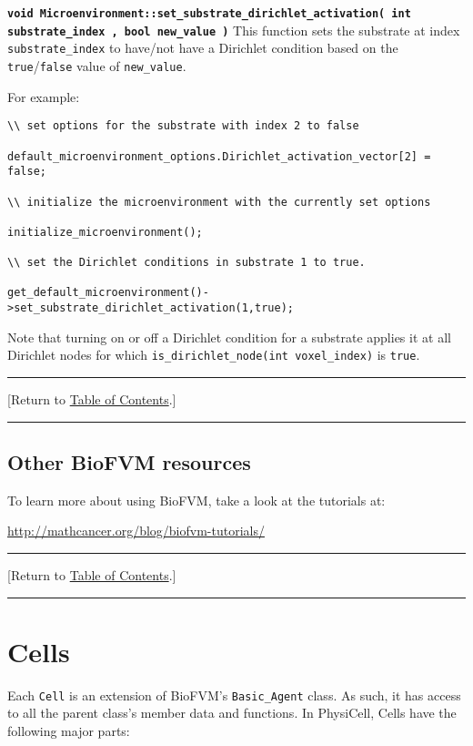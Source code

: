 \documentclass[12pt]{article}
\renewcommand{\v}{\verb}
\newcommand{\smallcode}[1]{\textbf{\texttt{#1}}}
\newcommand{\blue}[1]{\textcolor{blue}{#1}}
\newcommand{\DONE}{}%
\newcommand{\TOClink}{\begin{center}\hrule\vskip-10pt\phantom{.}\hfill[Return to \hyperlink{TOC}{Table of Contents}.]\hfill\phantom{.}\vskip3pt\hrule\end{center}}
\begin{document}
\smallcode{void Microenvironment::set\_substrate\_dirichlet\_activation( int substrate\_index , bool new\_value )} 
This function sets the substrate at index \v|substrate_index| to have/not have a Dirichlet condition 
based on the \v|true|/\v|false| value of \v|new_value|.


For example: 
\begin{verbatim}
\\ set options for the substrate with index 2 to false 

default_microenvironment_options.Dirichlet_activation_vector[2] = false; 

\\ initialize the microenvironment with the currently set options 

initialize_microenvironment(); 

\\ set the Dirichlet conditions in substrate 1 to true. 

get_default_microenvironment()->set_substrate_dirichlet_activation(1,true); 
\end{verbatim}

Note that turning on or off a Dirichlet condition for a substrate applies it at all Dirichlet nodes for 
which \v|is_dirichlet_node(int voxel_index)| is \v|true|. 

\TOClink

\subsection{Other BioFVM resources}
\label{sec:BioFVM_further_reading}
To learn more about using BioFVM, take a look at the tutorials at: 

\href{http://mathcancer.org/blog/biofvm-tutorials/}{http://mathcancer.org/blog/biofvm-tutorials/}

\TOClink

\section{Cells \DONE} 
\label{sec:Cells}
Each \v|Cell| is an extension of BioFVM's \v|Basic_Agent| class. As such, 
it has access to all the parent class's member data and functions. In PhysiCell, 
Cells have the following major parts: 
\end{document}
